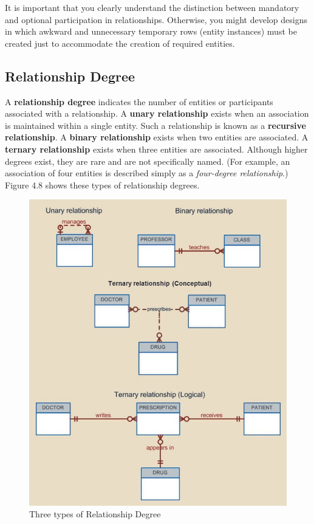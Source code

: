 \documentclass[a4paper, 12pt, titlepage]{report}
\begin{document}
{It is important that you clearly understand the distinction between mandatory and optional participation in relationships. Otherwise, you might develop designs in which
awkward and unnecessary temporary rows (entity instances) must be created just to accommodate the creation of required entities.

\subsection{Relationship Degree}
A \textbf{relationship degree} indicates the number of entities or participants associated with a relationship. A \textbf{unary relationship} exists when an association is maintained within a single entity. Such a relationship is known as a \textbf{recursive relationship}. A \textbf{binary relationship} exists when two entities are associated. A \textbf{ternary relationship} exists when three entities are associated. Although higher degrees exist, they are rare and are not specifically named. (For example, an association of four entities is described simply as a \emph{four-degree relationship}.) Figure 4.8 shows these types of relationship degrees.
\begin{figure}[H]
\centering
\includegraphics[scale=0.6]{Relation}
\caption{Three types of Relationship Degree}
\end{figure}

}
\end{document}
